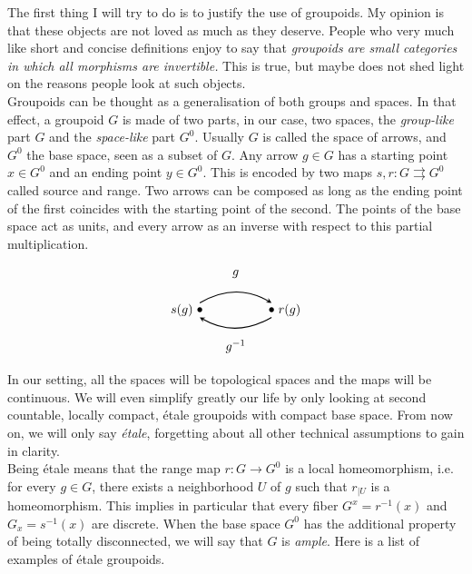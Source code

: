 The first thing I will try to do is to justify the use of groupoids. My opinion is that these objects are not loved as much as they deserve. People who very much like short and concise definitions enjoy to say that \textit{groupoids are small categories in which all morphisms are invertible.} This is true, but maybe does not shed light on the reasons people look at such objects. \\

Groupoids can be thought as a generalisation of both groups and spaces. In that effect, a groupoid $G$ is made of two parts, in our case, two spaces, the \textit{group-like} part $G$ and the \textit{space-like} part $G^0$. Usually $G$ is called the space of arrows, and $G^0$ the base space, seen as a subset of $G$. Any arrow $g\in G$ has a starting point $x\in G^0$ and an ending point $y\in G^0$. This is encoded by two maps $s,r : G \rightrightarrows G^0$ called source and range. Two arrows can be composed as long as the ending point of the first coincides with the starting point of the second. The points of the base space act as units, and every arrow as an inverse with respect to this partial multiplication.

\[\begin{tikzpicture}
\draw  (0,1) node {$g$};
\draw  (0,-1) node {$g^{-1}$};
\draw [>=stealth, ->, thick] (-1,0.2) to[bend left] (1,0.2);
\draw [>=stealth, ->,thick] (1,-0.2) to[bend left] (-1,-0.2);
\draw  (-1,0) node {$\bullet$};
\draw  (-1.5,0) node {$s(g)$};
\draw  (1,0) node {$\bullet$};
\draw  (1.5,0) node {$r(g)$};
\end{tikzpicture}\]

In our setting, all the spaces will be topological spaces and the maps will be continuous. We will even simplify greatly our life by only looking at second countable, locally compact, étale groupoids with compact base space. From now on, we will only say \textit{étale}, forgetting about all other technical assumptions to gain in clarity.\\ 

Being étale means that the range map $r: G \rightarrow G^0$ is a local homeomorphism, i.e. for every $g\in G$, there exists a neighborhood $U$ of $g$ such that $r_{|U}$ is a homeomorphism. This implies in particular that every fiber $G^x = r^{-1}(x)$ and $G_x = s^{-1}(x)$ are discrete. When the base space $G^0$ has the additional property of being totally disconnected, we will say that $G$ is \textit{ample}. Here is a list of examples of étale groupoids.\\

